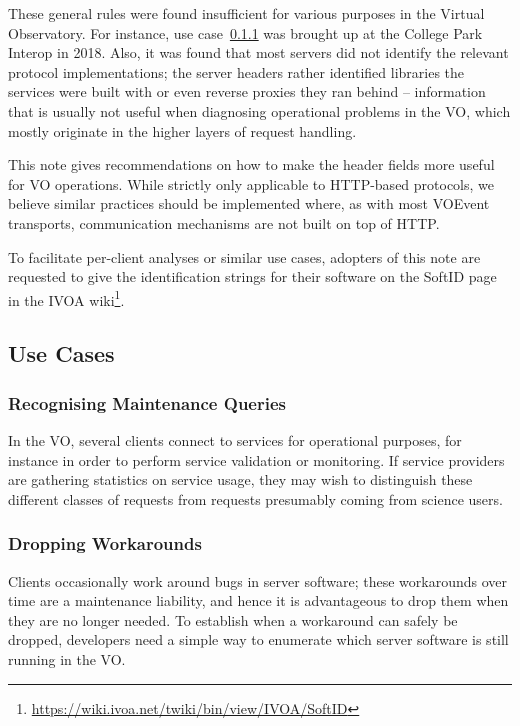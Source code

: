 \documentclass[11pt,a4paper]{ivoa}
\begin{document}
These general rules were found insufficient for various purposes in the
Virtual Observatory.  For instance, use case~\ref{uc:stats} was brought
up at the College Park Interop in 2018.  Also, it was found that most
servers did not identify the relevant protocol implementations; the
server headers rather identified
libraries the services were built with or even reverse proxies they
ran behind -- information that is usually not useful when diagnosing
operational problems in the VO, which mostly originate in the higher
layers of request handling.

This note gives recommendations on how to make the header fields more
useful for VO operations.  While strictly only applicable to HTTP-based
protocols, we believe similar practices should be implemented where, as
with most VOEvent transports, communication mechanisms are not built on
top of HTTP.

To facilitate per-client analyses or similar use cases, adopters of this
note are requested to give the identification strings for their software
on the SoftID page in the IVOA
wiki\footnote{\url{https://wiki.ivoa.net/twiki/bin/view/IVOA/SoftID}}.

\subsection{Use Cases}

\subsubsection{Recognising Maintenance Queries}
\label{uc:stats}

In the VO, several clients connect to services for operational purposes,
for instance in order to perform service validation or monitoring. If
service providers are gathering statistics on service usage, they may
wish to distinguish these different classes of requests from requests
presumably coming from science users.

\subsubsection{Dropping Workarounds}
\label{uc:global}

Clients occasionally work around bugs in server software; these
workarounds over time are a maintenance liability, and hence it is
advantageous to drop them when they are no longer needed.  To establish
when a workaround can safely be dropped, developers need a simple way to
enumerate which server software is still running in the VO.
\end{document}
